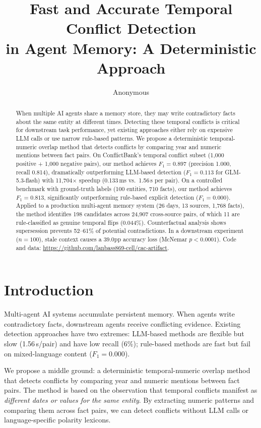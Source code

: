 \documentclass{article}
\title{Fast and Accurate Temporal Conflict Detection\\in Agent Memory: A Deterministic Approach}
\author{Anonymous}
\date{}
\begin{document}
\maketitle

\begin{abstract}
When multiple AI agents share a memory store, they may write contradictory facts about the same entity at different times. Detecting these temporal conflicts is critical for downstream task performance, yet existing approaches either rely on expensive LLM calls or use narrow rule-based patterns. We propose a deterministic temporal-numeric overlap method that detects conflicts by comparing year and numeric mentions between fact pairs. On ConflictBank's temporal conflict subset (1{,}000 positive + 1{,}000 negative pairs), our method achieves $F_1 = 0.897$ (precision 1.000, recall 0.814), dramatically outperforming LLM-based detection ($F_1 = 0.113$ for GLM-5.3-flash) with 11{,}704$\times$ speedup (0.133\,ms vs.\ 1.56\,s per pair). On a controlled benchmark with ground-truth labels (100 entities, 710 facts), our method achieves $F_1 = 0.813$, significantly outperforming rule-based explicit detection ($F_1 = 0.000$). Applied to a production multi-agent memory system (26 days, 13 sources, 1{,}768 facts), the method identifies 198 candidates across 24{,}907 cross-source pairs, of which 11 are rule-classified as genuine temporal flips (0.044\%). Counterfactual analysis shows supersession prevents 52--61\% of potential contradictions. In a downstream experiment ($n{=}100$), stale context causes a 39.0pp accuracy loss (McNemar $p < 0.0001$). Code and data: \url{https://github.com/lanbass869-cell/cac-artifact}.
\end{abstract}

\section{Introduction}

Multi-agent AI systems accumulate persistent memory. When agents write contradictory facts, downstream agents receive conflicting evidence. Existing detection approaches have two extremes: LLM-based methods are flexible but slow (1.56\,s/pair) and have low recall (6\%); rule-based methods are fast but fail on mixed-language content ($F_1 = 0.000$).

We propose a middle ground: a deterministic temporal-numeric overlap method that detects conflicts by comparing year and numeric mentions between fact pairs. The method is based on the observation that temporal conflicts manifest as \emph{different dates or values for the same entity}. By extracting numeric patterns and comparing them across fact pairs, we can detect conflicts without LLM calls or language-specific polarity lexicons.
\end{document}
